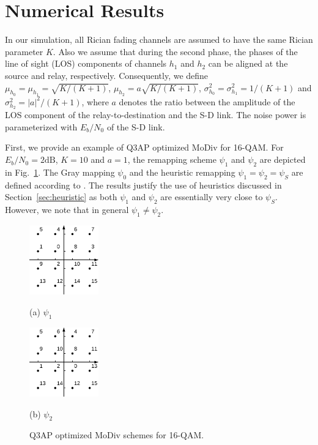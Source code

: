 \documentclass[journal]{IEEEtran}
\begin{document}
\section{Numerical Results}
\label{sec:simulation}
In our simulation, all Rician fading channels are assumed to have the same
Rician parameter $K$. Also we assume that during the second phase, the phases of the
line of sight (LOS) components of channels $h_1$ and $h_2$ can be aligned at the
source and relay, respectively.
Consequently, we define $\mu_{h_0} = \mu_{h_1} = \sqrt{K/(K + 1)}$,
$\mu_{h_2}=a\sqrt{K/(K + 1)}$,  $\sigma_{h_0}^2 = \sigma_{h_1}^2 = 1/(K+1)$ and
$\sigma_{h_2}^2 = |a|^2/(K+1)$, where $a$ denotes the ratio
between the amplitude of the LOS component of the
relay-to-destination and the S-D link. The noise power is
parameterized with $E_b/N_0$ of the S-D link.

First, we provide an example of Q3AP optimized MoDiv for 16-QAM. For $E_b/N_0 =
2\mbox{dB}$, $K = 10$ and $a = 1$, the remapping scheme $\psi_1$ and $\psi_2$
are depicted in Fig.~\ref{fig:example}. The Gray mapping $\psi_0$ and the
heuristic remapping $\psi_1=\psi_2=\psi_S$ are defined according to
\cite{seddik2008trans}. The results justify the use of heuristics discussed in
Section~\ref{sec:heuristic} as both $\psi_1$ and $\psi_2$ are essentially very
close to $\psi_S$. However, we note that in general $\psi_1\not=\psi_2$.

\begin{figure}[!t]
    \begin{minipage}[b]{0.48\linewidth}
      \centering
      \centerline{\includegraphics[width=3.0cm]{./figs/psi1.eps}}
      \centerline{(a) $\psi_1$}\medskip
    \end{minipage}
    \hfill
    \begin{minipage}[b]{.48\linewidth}
      \centering
      \centerline{\includegraphics[width=3.0cm]{./figs/psi2.eps}}
      \centerline{(b) $\psi_2$}\medskip
    \end{minipage}
    \caption{Q3AP optimized MoDiv schemes for 16-QAM.}
    \label{fig:example}
\end{figure}
\end{document}
